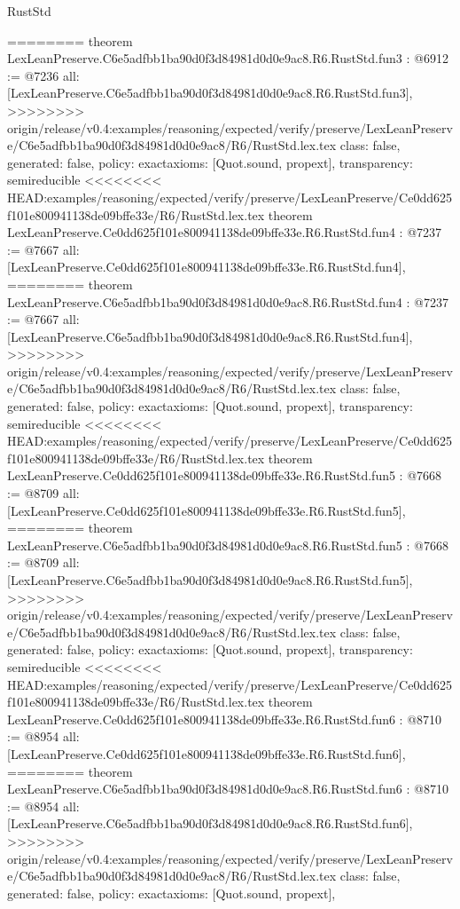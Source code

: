 \begin{lexlean}{RustStd}
\begin{coremodule}
{\begin{coremodule}
{{{{{{========
theorem LexLeanPreserve.C6e5adfbb1ba90d0f3d84981d0d0e9ac8.R6.RustStd.fun3 : @6912 := @7236 {
  all: [LexLeanPreserve.C6e5adfbb1ba90d0f3d84981d0d0e9ac8.R6.RustStd.fun3],
>>>>>>>> origin/release/v0.4:examples/reasoning/expected/verify/preserve/LexLeanPreserve/C6e5adfbb1ba90d0f3d84981d0d0e9ac8/R6/RustStd.lex.tex
  class: false,
  generated: false,
  policy: exact{axioms: [Quot.sound, propext]},
  transparency: semireducible
}
<<<<<<<< HEAD:examples/reasoning/expected/verify/preserve/LexLeanPreserve/Ce0dd625f101e800941138de09bffe33e/R6/RustStd.lex.tex
theorem LexLeanPreserve.Ce0dd625f101e800941138de09bffe33e.R6.RustStd.fun4 : @7237 := @7667 {
  all: [LexLeanPreserve.Ce0dd625f101e800941138de09bffe33e.R6.RustStd.fun4],
========
theorem LexLeanPreserve.C6e5adfbb1ba90d0f3d84981d0d0e9ac8.R6.RustStd.fun4 : @7237 := @7667 {
  all: [LexLeanPreserve.C6e5adfbb1ba90d0f3d84981d0d0e9ac8.R6.RustStd.fun4],
>>>>>>>> origin/release/v0.4:examples/reasoning/expected/verify/preserve/LexLeanPreserve/C6e5adfbb1ba90d0f3d84981d0d0e9ac8/R6/RustStd.lex.tex
  class: false,
  generated: false,
  policy: exact{axioms: [Quot.sound, propext]},
  transparency: semireducible
}
<<<<<<<< HEAD:examples/reasoning/expected/verify/preserve/LexLeanPreserve/Ce0dd625f101e800941138de09bffe33e/R6/RustStd.lex.tex
theorem LexLeanPreserve.Ce0dd625f101e800941138de09bffe33e.R6.RustStd.fun5 : @7668 := @8709 {
  all: [LexLeanPreserve.Ce0dd625f101e800941138de09bffe33e.R6.RustStd.fun5],
========
theorem LexLeanPreserve.C6e5adfbb1ba90d0f3d84981d0d0e9ac8.R6.RustStd.fun5 : @7668 := @8709 {
  all: [LexLeanPreserve.C6e5adfbb1ba90d0f3d84981d0d0e9ac8.R6.RustStd.fun5],
>>>>>>>> origin/release/v0.4:examples/reasoning/expected/verify/preserve/LexLeanPreserve/C6e5adfbb1ba90d0f3d84981d0d0e9ac8/R6/RustStd.lex.tex
  class: false,
  generated: false,
  policy: exact{axioms: [Quot.sound, propext]},
  transparency: semireducible
}
<<<<<<<< HEAD:examples/reasoning/expected/verify/preserve/LexLeanPreserve/Ce0dd625f101e800941138de09bffe33e/R6/RustStd.lex.tex
theorem LexLeanPreserve.Ce0dd625f101e800941138de09bffe33e.R6.RustStd.fun6 : @8710 := @8954 {
  all: [LexLeanPreserve.Ce0dd625f101e800941138de09bffe33e.R6.RustStd.fun6],
========
theorem LexLeanPreserve.C6e5adfbb1ba90d0f3d84981d0d0e9ac8.R6.RustStd.fun6 : @8710 := @8954 {
  all: [LexLeanPreserve.C6e5adfbb1ba90d0f3d84981d0d0e9ac8.R6.RustStd.fun6],
>>>>>>>> origin/release/v0.4:examples/reasoning/expected/verify/preserve/LexLeanPreserve/C6e5adfbb1ba90d0f3d84981d0d0e9ac8/R6/RustStd.lex.tex
  class: false,
  generated: false,
  policy: exact{axioms: [Quot.sound, propext]},
}}}}}}}}}}
\end{coremodule}}
\end{coremodule}
\end{lexlean}
